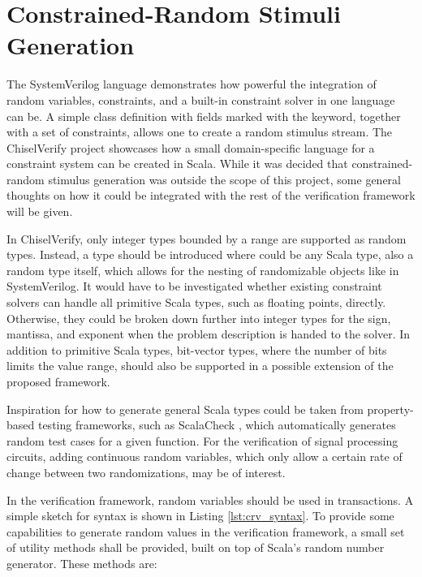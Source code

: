 \section{Constrained-Random Stimuli Generation} %
\label{sec:crv}



The SystemVerilog language demonstrates how powerful the integration of random variables, constraints, and
a built-in constraint solver in one language can be. A simple class definition with fields marked with the 
keyword, together with a set of constraints, allows one to create a random stimulus stream. The ChiselVerify project showcases how a small domain-specific language for a
constraint system can be created in Scala. While it was decided that constrained-random stimulus generation was outside the scope of this project, some general thoughts on how it could be integrated with the rest of the verification framework will be given. 

In ChiselVerify, only integer types bounded by a range are supported as random types. Instead, a  type
should be introduced where  could be any Scala type, also a random type itself, which allows for the nesting of
randomizable objects like in SystemVerilog. It would have to be investigated whether existing constraint solvers
can handle all primitive Scala types, such as floating points, directly. Otherwise, they could be broken down further
into integer types for the sign, mantissa, and exponent when the problem description is handed to the solver. In addition to primitive Scala types, bit-vector types, where the number of bits limits the value range, should also be
supported in a possible extension of the proposed framework. 

Inspiration for how to generate general Scala types could be taken from
property-based testing frameworks, such as ScalaCheck \cite{scalacheck}, which automatically generates random test
cases for a given function. For the verification of signal processing circuits, adding
continuous random variables, which only allow a certain rate of change between two randomizations, may be of interest.

In the verification framework, random variables should be used in transactions. A simple sketch for syntax is shown
in Listing \ref{lst:crv_syntax}. To provide some capabilities to generate random values in the verification framework, a small set of utility methods shall be provided, built on top of Scala's random number generator. These methods are:  

